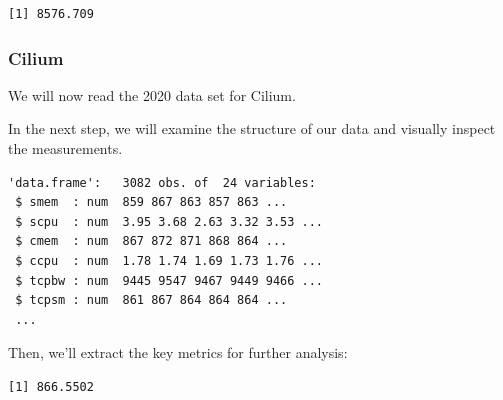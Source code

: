 \begin{verbatim}
[1] 8576.709
\end{verbatim}

\subsubsection{Cilium}

We will now read the 2020 data set for Cilium.

\begin{Shaded}
\begin{Highlighting}[]
\OtherTok{\textless{}{-}} 
\OtherTok{\textless{}{-}} \NormalTok{(}\NormalTok{,}\NormalTok{))}
\end{Highlighting}
\end{Shaded}

In the next step, we will examine the structure of our data and visually
inspect the measurements.

\begin{Shaded}
\begin{Highlighting}[]
\end{Highlighting}
\end{Shaded}

\begin{verbatim}
'data.frame':   3082 obs. of  24 variables:
 $ smem  : num  859 867 863 857 863 ...
 $ scpu  : num  3.95 3.68 2.63 3.32 3.53 ...
 $ cmem  : num  867 872 871 868 864 ...
 $ ccpu  : num  1.78 1.74 1.69 1.73 1.76 ...
 $ tcpbw : num  9445 9547 9467 9449 9466 ...
 $ tcpsm : num  861 867 864 864 864 ...
 ...
\end{verbatim}

Then, we'll extract the key metrics for further analysis:

\begin{Shaded}
\begin{Highlighting}[]
\SpecialCharTok{\$}
\end{Highlighting}
\end{Shaded}

\begin{verbatim}
[1] 866.5502
\end{verbatim}

\begin{Shaded}
\begin{Highlighting}[]
\SpecialCharTok{\$}
\end{Highlighting}
\end{Shaded}

